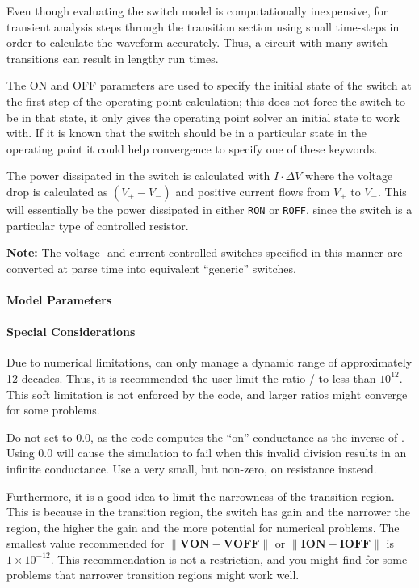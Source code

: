 \begin{Device}
Even though evaluating the switch model is computationally
inexpensive, for transient analysis \Xyce{} steps through the
transition section using small time-steps in order to calculate the
waveform accurately. Thus, a circuit with many switch transitions can
result in lengthy run times.

The ON and OFF parameters are used to specify the initial state of the
switch at the first step of the operating point calculation; this does
not force the switch to be in that state, it only gives the operating
point solver an initial state to work with.  If it is known that the
switch should be in a particular state in the operating point it could
help convergence to specify one of these keywords.

The power dissipated in the switch is calculated with $I \cdot \Delta V$ 
where the voltage drop is calculated as $(V_+ - V_-)$ and positive current 
flows from $V_+$ to $V_-$.  This will essentially be the power dissipated
in either \texttt{RON} or \texttt{ROFF}, since the switch is a particular 
type of controlled resistor.

\textbf{Note:} The voltage- and current-controlled switches specified
in this manner are converted at parse time into equivalent ``generic''
switches.

\end{Device}

\pagebreak

\paragraph{Model Parameters}


\paragraph{Special Considerations}

\begin{XyceItemize}
\item Due to numerical limitations, \Xyce{} can only manage a dynamic range of
  approximately 12 decades.  Thus, it is recommended the user limit the ratio
  / to less than $10^{12}$.  This soft limitation is not enforced by the code, and larger ratios might converge for some problems.
\item Do not set  to 0.0, as the code computes the ``on'' conductance as the inverse of .  Using 0.0 will cause the simulation to fail when this invalid division results in an infinite conductance.  Use a very small, but non-zero, on resistance instead.
\item Furthermore, it is a good idea to limit the narrowness of the transition
  region. This is because in the transition region, the switch has gain and the
  narrower the region, the higher the gain and the more potential for numerical
  problems.  The smallest value recommended for $\|\mathbf{VON - VOFF}\|$ or
  $\|\mathbf{ION - IOFF}\|$ is $1\times10^{-12}$.  This recommendation is not a restriction, and you might find for some problems that narrower transition regions might work well.
\end{XyceItemize}

